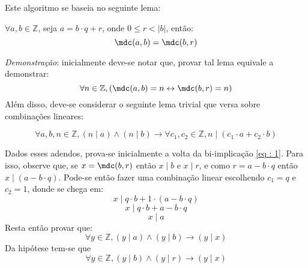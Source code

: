 \noindent
Este algoritmo se baseia no seguinte lema:
\begin{lema} \label{lema:euclides}
    $\forall a, b \in \mathbb{Z}$, seja $a = b \cdot q  + r$, onde $0 \leq r < |b|$, então:
    \begin{equation*}
        \mdc(a, b) = \mdc(b, r)
    \end{equation*}
\end{lema}
\noindent
\textit{Demonstração}: inicialmente deve-se notar que, provar tal lema equivale a demonstrar:
        \begin{equation} \label{eq : 1}
            \forall n \in \mathbb{Z}, (\mdc(a, b) = n \leftrightarrow \mdc(b, r) = n)
        \end{equation}
        Além disso, deve-se considerar o seguinte lema trivial que versa sobre combinações lineares:
        \begin{lema}
            \begin{equation*}
                \forall a, b, n \in \mathbb{Z}, (n \mid a) \land (n \mid b) \rightarrow \forall c_1, c_2 \in \mathbb{Z}, n \mid (c_1 \cdot a + c_2 \cdot b)
            \end{equation*}
        \end{lema}
        Dados esses adendos, prova-se inicialmente a volta da bi-implicação \ref{eq : 1}. Para isso, observe que, se $x = \mdc(b, r)$ então $x \mid b$ e $x \mid r$, e como $r = a - b \cdot q$ então $x \mid (a - b \cdot q)$. Pode-se então fazer uma combinação linear escolhendo $c_1 = q$ e $c_2 = 1$, donde se chega em:
        \begin{equation*}
                x \mid q \cdot b + 1 \cdot (a - b \cdot q)
        \end{equation*}
        \begin{equation*}
                x \mid q \cdot b + a - b \cdot q
        \end{equation*}
        \begin{equation*}
                x \mid a
        \end{equation*}
        Resta então provar que:
        \begin{equation*}
            \forall y \in \mathbb{Z}, (y \mid a) \land (y \mid b) \rightarrow (y \mid x) 
        \end{equation*}
        Da hipótese tem-se que
        \begin{equation*}
            \forall y \in \mathbb{Z}, (y \mid b) \land (y \mid r) \rightarrow (y \mid x) 
        \end{equation*}

